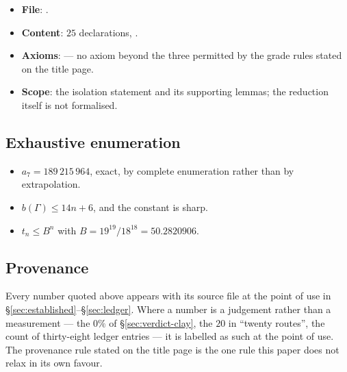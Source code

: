 \begin{itemize}
\item \textbf{File}: .
\item \textbf{Content}: $25$ declarations, .
\item \textbf{Axioms}:  --- no axiom beyond the three
permitted by the grade rules stated on the title page.
\item \textbf{Scope}: the isolation statement and its supporting lemmas; the reduction itself is
not formalised.
\end{itemize}

\subsection*{Exhaustive enumeration}

\begin{itemize}
\item $a_7 = 189\,215\,964$, exact, by complete enumeration rather than by extrapolation.
\item $b(\Gamma) \le 14n + 6$, and the constant is sharp.
\item $t_n \le B^n$ with $B = 19^{19}/18^{18} = 50.2820906$.
\end{itemize}

\subsection*{Provenance}

Every number quoted above appears with its source file at the point of use in
\S\ref{sec:established}--\S\ref{sec:ledger}. Where a
number is a judgement rather than a measurement --- the $0\%$ of \S\ref{sec:verdict-clay}, the $20$
in ``twenty
routes'', the count of thirty-eight ledger entries --- it is labelled as such at the point of use.
The provenance rule stated on the title page is the one rule this paper does not relax in its own
favour.
